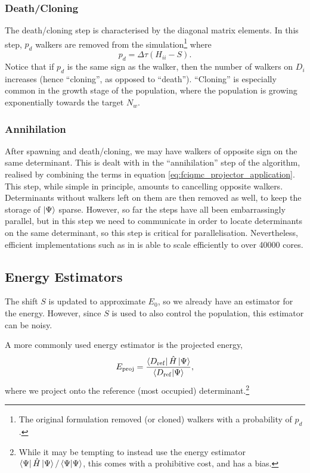 \subsubsection{Death/Cloning}

The death/cloning step is characterised by the diagonal matrix elements. In this step, $p_d$ walkers are removed from the simulation\footnote{The original formulation removed (or cloned) walkers with a probability of $p_d$.} where
\begin{equation}
    p_d = \Delta\tau(H_{ii}-S).
\end{equation}
Notice that if $p_d$ is the same sign as the walker, then the number of walkers on $D_i$ increases (hence ``cloning'', as opposed to ``death''). ``Cloning'' is especially common in the growth stage of the population, where the population is growing exponentially towards the target $N_w$.

\subsubsection{Annihilation}

After spawning and death/cloning, we may have walkers of opposite sign on the same determinant. This is dealt with in the ``annihilation'' step of the algorithm, realised by combining the terms in equation \ref{eq:fciqmc_projector_application}. This step, while simple in principle, amounts to cancelling opposite walkers. Determinants without walkers left on them are then removed as well, to keep the storage of $\ket\Psi$ sparse. However, so far the steps have all been embarrassingly parallel, but in this step we need to communicate in order to locate determinants on the same determinant, so this step is critical for parallelisation. Nevertheless, efficient implementations such as in \neci is able to scale efficiently to over 40000 cores.\supercite{Booth2014}

\subsection{Energy Estimators}
\label{sec:fciqmc_energy_estimators}

The shift $S$ is updated to approximate $E_0$, so we already have an estimator for the energy. However, since $S$ is used to also control the population, this estimator can be noisy.\supercite{booth_fciqmc_2009}

A more commonly used energy estimator is the projected energy,
\begin{equation}
    \label{eq:projected_energy}
    E_\mathrm{proj} = \frac{\bra{D_\mathrm{ref}}\hat H\ket{\Psi}}{\braket{D_\mathrm{ref}}{\Psi}},
\end{equation}
where we project onto the reference (most occupied) determinant.\footnote{While it may be tempting to instead use the energy estimator $\bra{\Psi}\hat H\ket{\Psi}/\braket{\Psi}{\Psi}$, this comes with a prohibitive cost, and has a bias.\supercite{bluntDensitymatrix2014,booth_fciqmc_2009}
}

